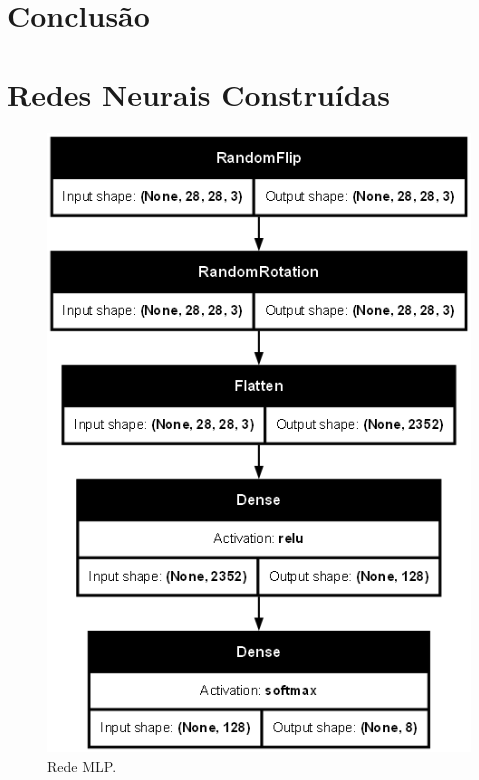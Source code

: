 \documentclass[final,5p]{elsarticle}
\numberwithin{equation}{section}
\begin{document}
\section{Conclusão}


\appendix




\section{Redes Neurais Construídas}

\begin{figure}[H]
    \includegraphics[width=0.95\columnwidth]{MLP_model.png}
    \caption{Rede MLP.}\label{fig:ModeloMLP}
\end{figure}
\end{document}

